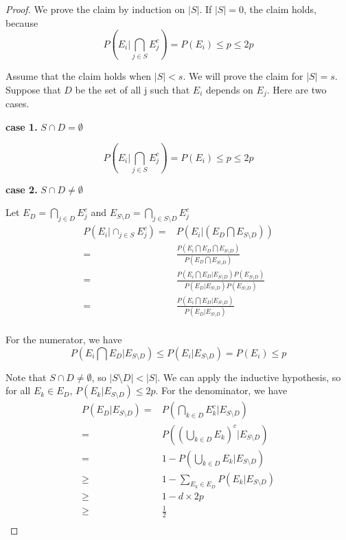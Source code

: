 \documentclass{article}
\begin{document}
\begin{proof}
We prove the claim by induction on $|S|$. If $|S|= 0$, the claim holds, because
$$P\left(E_i\Bigg| \bigcap_{j\in S}E_j^c\right)=P\left(E_i\right)\leq p \leq 2p$$

Assume that the claim holds when $|S|<s$. We will prove the claim for $|S|=s$. Suppose that $D$ be the set of all j such that $E_i$ depends on $E_j$. Here are two cases.

\textbf{case 1.} $S \cap D = \emptyset$

$$P\left(E_i\Bigg| \bigcap_{j\in S}E_j^c\right)=P(E_i)\leq p \leq 2p$$

\textbf{case 2.} $S \cap D \neq \emptyset$

Let $E_D = \bigcap_{j\in D}E_j^c$ and $E_{S\setminus D}=\bigcap_{j\in S\setminus D}E_j^c$
\begin{equation}\label{eq1}
    \begin{array}{rl}
        P\left(E_i\Big| \cap_{j\in S}E_j^c\right) 
        = &  P\left(E_i\Big| \left(E_D\bigcap E_{S\setminus D}\right)\right) \\
        = &  \frac{P\left(E_i \bigcap E_D\bigcap E_{S\setminus D}\right)}
        {P \left(E_D\bigcap E_{S\setminus D}\right)} \\
        = &\frac{P\left(E_i \bigcap E_D\big| E_{S\setminus D}\right)P\left(E_{S\setminus D}\right)}
        {P\left(E_D\big| E_{S\setminus D}\right)P\left(E_{S\setminus D}\right)} \\
        = &\frac{P\left(E_i \bigcap E_D\big| E_{S\setminus D}\right)}
        {P\left(E_D\big| E_{S\setminus D}\right)} \\
    \end{array}    
\end{equation}

For the numerator, we have
\begin{equation}\label{eq2}
P\left(E_i \bigcap E_D\Big| E_{S\setminus D}\right) \leq P\left(E_i\Big| E_{S\setminus D}\right)=P\left(E_i\right)\leq p    
\end{equation}

Note that $S \cap D \neq \emptyset$, so $|S\setminus D|<|S|$. We can apply the inductive hypothesis, so for all $E_k\in E_D$, $P(E_k|E_{S\setminus D})\leq 2p$.  For the  denominator, we have
\begin{equation}\label{eq3}
   \begin{array}{rl}
        P\left(E_D| E_{S\setminus D}\right)
        = & P\left(\bigcap_{k\in D}E_k^c \Big| E_{S\setminus D}\right) \\
        = & P\left(\left(\bigcup_{k\in D}E_k\right)^c\Big| E_{S\setminus D}\right) \\
        = & 1-P\left(\bigcup_{k\in D}E_k\Big| E_{S\setminus D}\right) \\
      \geq & 1-\sum\limits_{E_k\in E_D}P\left(E_k\Big| E_{S\setminus D}\right) \\
      \geq & 1-d\times 2p \\
      \geq & \frac{1}{2}  \\
   \end{array}
\end{equation}


\end{proof}
\end{document}
